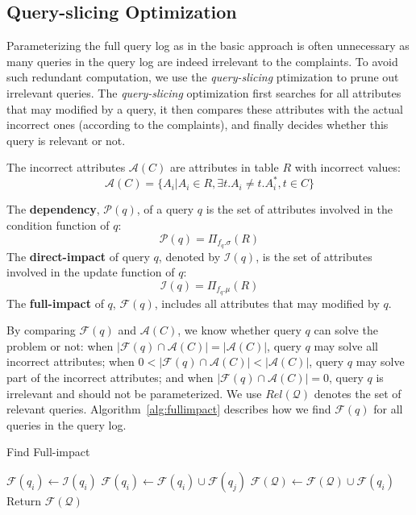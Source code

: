 \subsection{Query-slicing Optimization}
\label{sec:opt:query}
Parameterizing the full query log as in the basic approach 
is often unnecessary as many queries in the query log 
are indeed irrelevant to the complaints.
To avoid such redundant computation, we use the \textit{query-slicing} 
ptimization to prune out irrelevant queries. The \textit{query-slicing} 
optimization first searches for all attributes that may modified by a query, 
it then compares these attributes with the actual incorrect ones (according
to the complaints), and finally decides whether this query is relevant or not.
\begin{definition} 
	The incorrect attributes $\mathcal{A}(C)$ are attributes in 
	table $R$ with incorrect values: 
	\[\mathcal{A}(C) = \{A_i|A_i\in R, \exists t.A_i \neq t.A_i^*, t\in C\}\]
\end{definition} 
\begin{definition}
    The \textbf{dependency}, $\mathcal{P}(q)$, of a query $q$
    is the set of 
    attributes involved in the condition function of $q$:
    \[\mathcal{P}(q) = \Pi_{f_{q}.\sigma}(R)\]
    The \textbf{direct-impact} of query $q$, denoted
    by $\mathcal{I}(q)$, is the set of attributes 
    involved in the update function of $q$:
    \[\mathcal{I}(q) = \Pi_{f_{q}.\mu}(R)\]
    The \textbf{full-impact}
    of $q$, $\mathcal{F}(q)$, includes all attributes 
    that may modified by $q$.  
\end{definition}
By comparing $\mathcal{F}(q)$ and $\mathcal{A}(C)$, we know whether
query $q$ can solve the problem or not: when $|\mathcal{F}(q) \cap 
\mathcal{A}(C)|=|\mathcal{A}(C)|$, query $q$ may solve all incorrect 
attributes; when $0 < |\mathcal{F}(q) \cap 
\mathcal{A}(C)|< |\mathcal{A}(C)|$, query $q$ may solve part of the 
incorrect attributes; and when $|\mathcal{F}(q) \cap 
\mathcal{A}(C)|=0$, query $q$ is irrelevant and should not be 
parameterized. We use $Rel\mathcal{(Q)}$ 
denotes the set of relevant queries. 
Algorithm~\ref{alg:fullimpact} describes how we find
$\mathcal{F}(q)$ for all queries in the query log.
\begin{algorithm}[htbp]
\caption{Find Full-impact}
\label{alg:fullimpact}
\begin{algorithmic}
\STATE $\mathcal{F}(q_i) \leftarrow \mathcal{I}(q_i)$
\STATE $\mathcal{F}(q_i) \leftarrow \mathcal{F}(q_i) \cup \mathcal{F}(q_j)$
\ENDIF
\ENDFOR
\STATE $\mathcal{F}(\mathcal{Q}) \leftarrow \mathcal{F}(\mathcal{Q}) \cup \mathcal{F}(q_i)$
\ENDFOR
\STATE Return $\mathcal{F}(\mathcal{Q})$
\end{algorithmic}
\end{algorithm}
